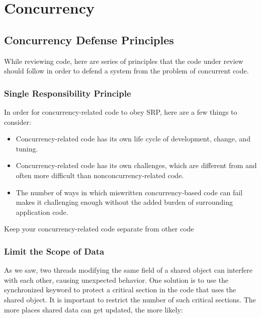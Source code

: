 
\chapter{Concurrency}

\section{Concurrency Defense Principles}

While reviewing code, here are series of principles that the code under review should  follow in order to defend a system from the problem of concurrent code.

\subsection{Single Responsibility Principle}

In order for concurrency-related code to obey SRP, here are a few things to consider:

\begin{itemize}
    \item Concurrency-related code has its own life cycle of development, change, and tuning.
    \item Concurrency-related code has its own challenges, which are different from and often more difficult than nonconcurrency-related code.
    \item The number of ways in which miswritten concurrency-based code can fail makes it challenging enough without the added burden of surrounding application code.
\end{itemize}

\begin{marker}
Keep your concurrency-related code separate from other code
\end{marker}

\subsection{Limit the Scope of Data}

As we saw, two threads modifying the same field of a shared object can interfere with each other, causing unexpected behavior. One solution is to use the synchronized keyword to protect a critical section in the code that uses the shared object. It is important to restrict the number of such critical sections. The more places shared data can get updated, the more likely:

